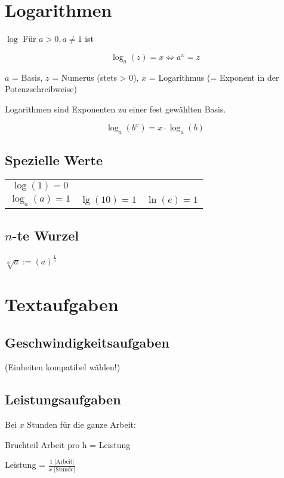 \begin{multicols}{2}
\hrulefill
\section{Logarithmen}

\begin{definition}{$\log$}{}
Für $a>0, a\ne 1$ ist

$$\log_a{}(z)=x \Longleftrightarrow{} a^x = z$$
\end{definition}
$a$ = Basis, $z$ = Numerus (stets > 0), $x$ = Logarithmus (= Exponent in der Potenzschreibweise)

Logarithmen sind Exponenten zu einer fest gewählten Basis.

\begin{gesetz}{}{}
$$\log_a(b^x) = x\cdot{}\log_a(b)$$
\end{gesetz}

\subsection{Spezielle Werte}
\begin{tabular}{ccc}
$\log(1)=0$     &               &\\
$\log_a(a) = 1$ & $\lg(10) = 1$ & $\ln(e) = 1$\\
\end{tabular} 

\subsection{$n$-te Wurzel}
$\sqrt[n]{a} := \left(a\right)^\frac1n$

\hrulefill
\section{Textaufgaben}

\subsection{Geschwindigkeitsaufgaben}
 (Einheiten kompatibel wählen!)

\subsection{Leistungsaufgaben}
Bei $x$ Stunden für die ganze Arbeit:

Bruchteil Arbeit pro h = Leistung

Leistung = $\frac{1 \textrm{ [Arbeit]}}{x \textrm{ [Stunde]}}$


\end{multicols}
